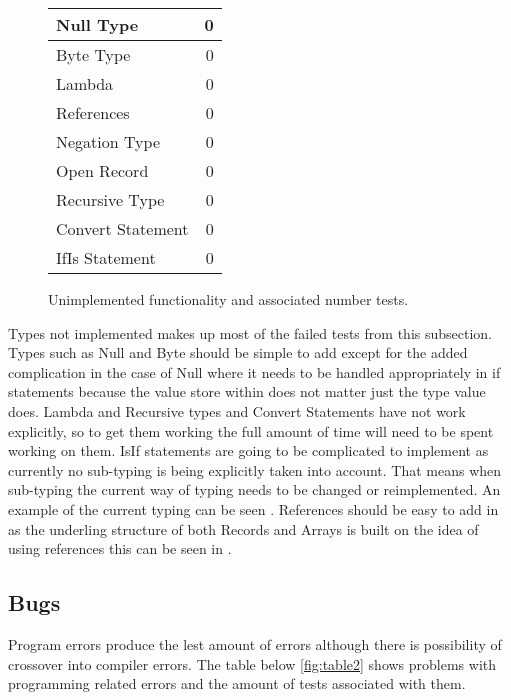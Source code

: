 \begin{figure}[H]
  \centering
  \begin{tabular}{| l || r |}
  \hline
  Null Type & 0 \\ \hline
  Byte Type & 0 \\ \hline
  Lambda & 0 \\ \hline
  References & 0 \\ \hline
  Negation Type & 0 \\ \hline
  Open Record & 0 \\ \hline
  Recursive Type & 0 \\ \hline
  Convert Statement& 0 \\ \hline
  IfIs Statement & 0 \\ 
  \hline
  \end{tabular}
  \caption{Unimplemented functionality and associated number tests.}
  \label{fig:table1}
\end{figure}

Types not implemented makes up most of the failed tests from this subsection. Types such as Null and Byte should be simple to add except for the added complication in the case of Null where it needs to be handled appropriately in if statements because the value store within does not matter just the type value does.%
Lambda and Recursive types and Convert Statements have not work explicitly, so to get them working the full amount of time will need to be spent working on them. IsIf statements are going to be complicated to implement as currently no sub-typing is being explicitly taken into account. That means when sub-typing the current way of typing needs to be changed or reimplemented. An example of the current typing can be seen %
. 
References should be easy to add in as the underling structure of both Records and Arrays is built on the idea of using references this can be seen in %
. %

\subsection{Bugs}


Program errors produce the lest amount of errors although there is possibility of crossover into compiler errors. The table below \ref{fig:table2} shows problems with programming related errors and the amount of tests associated with them.

